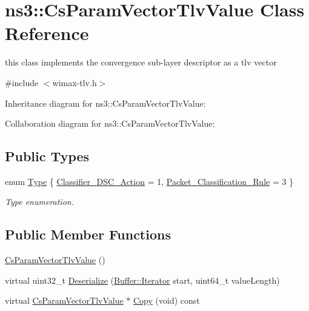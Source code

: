 \hypertarget{classns3_1_1CsParamVectorTlvValue}{}\section{ns3\+:\+:Cs\+Param\+Vector\+Tlv\+Value Class Reference}
\label{classns3_1_1CsParamVectorTlvValue}


this class implements the convergence sub-\/layer descriptor as a tlv vector  




{\ttfamily \#include $<$wimax-\/tlv.\+h$>$}



Inheritance diagram for ns3\+:\+:Cs\+Param\+Vector\+Tlv\+Value\+:


Collaboration diagram for ns3\+:\+:Cs\+Param\+Vector\+Tlv\+Value\+:
\subsection*{Public Types}
\begin{DoxyCompactItemize}
\item 
enum \hyperlink{classns3_1_1CsParamVectorTlvValue_a72ca87bab4986bec8ee954c8d223ca2b}{Type} \{ \hyperlink{classns3_1_1CsParamVectorTlvValue_a72ca87bab4986bec8ee954c8d223ca2bad2d71189ca938c2c6a716b9d4a996c31}{Classifier\+\_\+\+D\+S\+C\+\_\+\+Action} = 1, 
\hyperlink{classns3_1_1CsParamVectorTlvValue_a72ca87bab4986bec8ee954c8d223ca2ba56aa6665cbc24e0799ae7c6d056addc8}{Packet\+\_\+\+Classification\+\_\+\+Rule} = 3
 \}\begin{DoxyCompactList}\small\item\em Type enumeration. \end{DoxyCompactList}
\end{DoxyCompactItemize}
\subsection*{Public Member Functions}
\begin{DoxyCompactItemize}
\item 
\hyperlink{classns3_1_1CsParamVectorTlvValue_a7f853f0fbb42d111ad661cb9e603095b}{Cs\+Param\+Vector\+Tlv\+Value} ()
\item 
virtual uint32\+\_\+t \hyperlink{classns3_1_1CsParamVectorTlvValue_aac92059eae88c45aa6753737e9e768b8}{Deserialize} (\hyperlink{classns3_1_1Buffer_1_1Iterator}{Buffer\+::\+Iterator} start, uint64\+\_\+t value\+Length)
\item 
virtual \hyperlink{classns3_1_1CsParamVectorTlvValue}{Cs\+Param\+Vector\+Tlv\+Value} $\ast$ \hyperlink{classns3_1_1CsParamVectorTlvValue_aa4864da7204c8c661004c15683377f44}{Copy} (void) const 
\end{DoxyCompactItemize}


